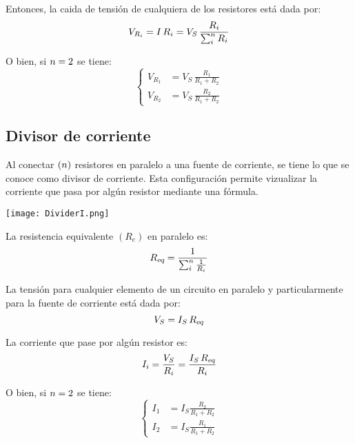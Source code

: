 \documentclass[a5paper,12pt,twoside]{book}
\begin{document}
Entonces, la caida de tensión de cualquiera de los resistores está dada por:
\begin{equation*}
    V_{R_i} = I \, R_i = V_S \, \frac{R_i}{\sum_i^n R_i}
\end{equation*}

O bien, si $n=2$ se tiene:
\begin{equation*}
    \left\{
    \begin{aligned}
        V_{R_1} &= V_S \, \frac{R_1}{R_1 + R_2}
        \\[1ex]
        V_{R_2} &= V_S \, \frac{R_2}{R_1 + R_2}
    \end{aligned}
    \right.
\end{equation*}


\subsection*{Divisor de corriente}

Al conectar $(n)$ resistores en paralelo a una fuente de corriente, se tiene lo que se conoce como divisor de corriente. Esta configuración permite vizualizar la corriente que pasa por algún resistor mediante una fórmula.

\begin{center}
    \texttt{[image: DividerI.png]}
\end{center}

La resistencia equivalente $(R_e)$ en paralelo es:
\begin{equation*}
    {{R}_\textsl{{eq}}} = \frac{1}{\sum_i^n \frac{1}{R_i}}
\end{equation*}

La tensión para cualquier elemento de un circuito en paralelo y particularmente para la fuente de corriente está dada por:
\begin{equation*}
    V_S = I_S \, {{R}_\textsl{{eq}}}
\end{equation*}

La corriente que pase por algún resistor es:
\begin{equation*}
    I_i = \frac{V_S}{R_i} = \frac{I_S \, {{R}_\textsl{{eq}}}}{R_i}
\end{equation*}

O bien, si $n=2$ se tiene:
\begin{equation*}
    \left\{
    \begin{aligned}
        I_1 &= I_S \frac{R_2}{R_1 + R_2}
        \\
        I_2 &= I_S \frac{R_1}{R_1 + R_2}
    \end{aligned}
    \right.
\end{equation*}
\end{document}
